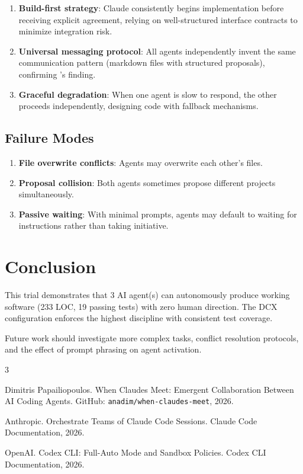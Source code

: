 \documentclass[11pt,a4paper]{article}
\begin{document}
\begin{enumerate}
  \item \textbf{Build-first strategy}: Claude consistently begins implementation before
    receiving explicit agreement, relying on well-structured interface contracts to
    minimize integration risk.
  \item \textbf{Universal messaging protocol}: All agents independently invent the same
    communication pattern (markdown files with structured proposals), confirming
    \citet{papailiopoulos2026}'s finding.
  \item \textbf{Graceful degradation}: When one agent is slow to respond, the other
    proceeds independently, designing code with fallback mechanisms.
\end{enumerate}

\subsection{Failure Modes}

\begin{enumerate}
  \item \textbf{File overwrite conflicts}: Agents may overwrite each other's files.
  \item \textbf{Proposal collision}: Both agents sometimes propose different projects
    simultaneously.
  \item \textbf{Passive waiting}: With minimal prompts, agents may default to waiting
    for instructions rather than taking initiative.
\end{enumerate}

\section{Conclusion}

This trial demonstrates that 3 AI agent(s) can autonomously
produce working software (233 LOC, 19 passing tests) with zero human direction. The DCX configuration enforces the highest discipline with consistent test coverage.

Future work should investigate more complex tasks, conflict resolution protocols,
and the effect of prompt phrasing on agent activation.


\begin{thebibliography}{3}

Dimitris Papailiopoulos.
\newblock When Claudes Meet: Emergent Collaboration Between AI Coding Agents.
\newblock GitHub: \texttt{anadim/when-claudes-meet}, 2026.

Anthropic.
\newblock Orchestrate Teams of Claude Code Sessions.
\newblock Claude Code Documentation, 2026.

OpenAI.
\newblock Codex CLI: Full-Auto Mode and Sandbox Policies.
\newblock Codex CLI Documentation, 2026.

\end{thebibliography}
\end{document}
